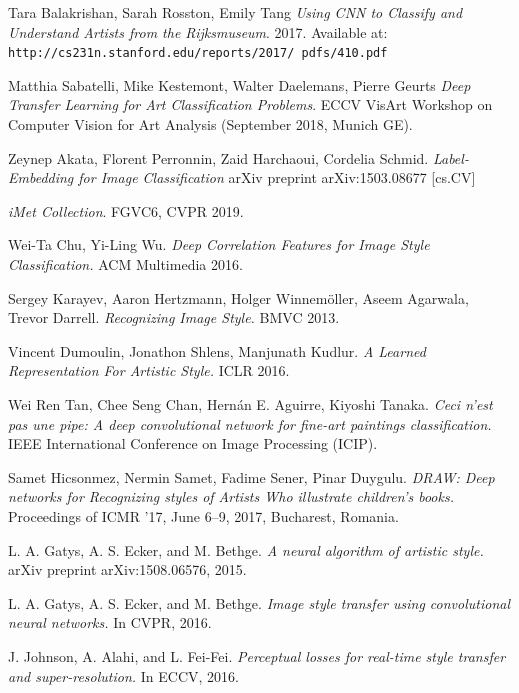 \documentclass[10pt,twocolumn,letterpaper]{article}
\begin{document}
{\small


\begin{thebibliography}{9}

Tara Balakrishan, Sarah Rosston, Emily Tang
\textit{Using CNN to Classify and Understand Artists from the Rijksmuseum}.
2017. Available at: \texttt{http://cs231n.stanford.edu/reports/2017/ pdfs/410.pdf}

Matthia Sabatelli, Mike Kestemont, Walter Daelemans, Pierre Geurts
\textit{Deep Transfer Learning for Art Classification Problems}.
ECCV VisArt Workshop on Computer Vision for Art Analysis (September 2018, Munich GE).

Zeynep Akata, Florent Perronnin, Zaid Harchaoui, Cordelia Schmid. 
\textit{Label-Embedding for Image Classification}
arXiv preprint arXiv:1503.08677 [cs.CV]


\textit{iMet Collection}. 
 FGVC6, CVPR 2019.

Wei-Ta Chu, Yi-Ling Wu.
\textit{Deep Correlation Features for Image Style Classification.}
ACM Multimedia 2016.

Sergey Karayev, Aaron Hertzmann, Holger Winnemöller, Aseem Agarwala, Trevor Darrell.
\textit{Recognizing Image Style.}
BMVC 2013.

Vincent Dumoulin, Jonathon Shlens, Manjunath Kudlur.
\textit{A Learned Representation For Artistic Style.}
ICLR 2016.

Wei Ren Tan, Chee Seng Chan, Hernán E. Aguirre, Kiyoshi Tanaka.
\textit{Ceci n'est pas une pipe: A deep convolutional network for fine-art paintings classification.}
IEEE International Conference on Image Processing (ICIP).

Samet Hicsonmez, Nermin Samet, Fadime Sener, Pinar Duygulu.
\textit{DRAW: Deep networks for Recognizing styles of Artists Who illustrate children's books.}
Proceedings of ICMR ’17, June 6–9, 2017, Bucharest, Romania.

L. A. Gatys, A. S. Ecker, and M. Bethge.
\textit{A neural algorithm of artistic style.}
arXiv preprint arXiv:1508.06576, 2015.

L. A. Gatys, A. S. Ecker, and M. Bethge.
\textit{Image style transfer using convolutional neural networks.}
In CVPR, 2016.

J. Johnson, A. Alahi, and L. Fei-Fei.
\textit{ Perceptual losses for real-time style transfer and super-resolution.}
In ECCV, 2016.


\end{thebibliography}}
\end{document}
